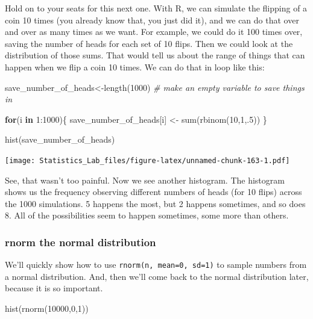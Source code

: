 \documentclass[
]{book}
\newenvironment{Shaded}{\begin{snugshade}}{\end{snugshade}}
\newcommand{\CommentTok}[1]{\textcolor[rgb]{0.56,0.35,0.01}{\textit{#1}}}
\newcommand{\ControlFlowTok}[1]{\textcolor[rgb]{0.13,0.29,0.53}{\textbf{#1}}}
\newcommand{\DecValTok}[1]{\textcolor[rgb]{0.00,0.00,0.81}{#1}}
\newcommand{\FunctionTok}[1]{\textcolor[rgb]{0.00,0.00,0.00}{#1}}
\newcommand{\NormalTok}[1]{#1}
\newcommand{\OtherTok}[1]{\textcolor[rgb]{0.56,0.35,0.01}{#1}}
\newcommand{\SpecialCharTok}[1]{\textcolor[rgb]{0.00,0.00,0.00}{#1}}
\begin{document}
Hold on to your seats for this next one. With R, we can simulate the flipping of a coin 10 times (you already know that, you just did it), and we can do that over and over as many times as we want. For example, we could do it 100 times over, saving the number of heads for each set of 10 flips. Then we could look at the distribution of those sums. That would tell us about the range of things that can happen when we flip a coin 10 times. We can do that in loop like this:

\begin{Shaded}
\begin{Highlighting}[]
\NormalTok{save\_number\_of\_heads}\OtherTok{\textless{}{-}}\FunctionTok{length}\NormalTok{(}\DecValTok{1000}\NormalTok{) }\CommentTok{\# make an empty variable to save things in}

\ControlFlowTok{for}\NormalTok{(i }\ControlFlowTok{in} \DecValTok{1}\SpecialCharTok{:}\DecValTok{1000}\NormalTok{)\{}
\NormalTok{  save\_number\_of\_heads[i] }\OtherTok{\textless{}{-}} \FunctionTok{sum}\NormalTok{(}\FunctionTok{rbinom}\NormalTok{(}\DecValTok{10}\NormalTok{,}\DecValTok{1}\NormalTok{,.}\DecValTok{5}\NormalTok{))}
\NormalTok{\}}

\FunctionTok{hist}\NormalTok{(save\_number\_of\_heads)}
\end{Highlighting}
\end{Shaded}

\texttt{[image: Statistics\_Lab\_files/figure-latex/unnamed-chunk-163-1.pdf]}

See, that wasn't too painful. Now we see another histogram. The histogram shows us the frequency observing different numbers of heads (for 10 flips) across the 1000 simulations. 5 happens the most, but 2 happens sometimes, and so does 8. All of the possibilities seem to happen sometimes, some more than others.

\hypertarget{rnorm-the-normal-distribution}{%
\subsubsection{rnorm the normal distribution}\label{rnorm-the-normal-distribution}}

We'll quickly show how to use \texttt{rnorm(n,\ mean=0,\ sd=1)} to sample numbers from a normal distribution. And, then we'll come back to the normal distribution later, because it is so important.

\begin{Shaded}
\begin{Highlighting}[]
\FunctionTok{hist}\NormalTok{(}\FunctionTok{rnorm}\NormalTok{(}\DecValTok{10000}\NormalTok{,}\DecValTok{0}\NormalTok{,}\DecValTok{1}\NormalTok{))}
\end{Highlighting}
\end{Shaded}
\end{document}
